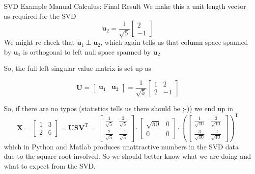 \documentclass[mathserif, aspectratio=1610]{intbeamer}
\begin{document}
\begin{frame}[t]{SVD Example Manual Calculus: Final Result}
We make this a unit length vector as required for the SVD
$$
\bm{u}_2 = \frac{1}{\sqrt{5}}\begin{bmatrix}2\\-1\end{bmatrix}
$$
We might re-check that $\bm{u}_1 \perp \bm{u}_2$, which again tells us
that column space spanned by $\bm{u}_1$ is orthogonal to left null space spanned by $\bm{u}_2$

So, the full left singular value matrix is set up as


$$
\bm{U} =
\begin{bmatrix}
\bm{u}_1 & \bm{u}_2
\end{bmatrix}=
\frac{1}{\sqrt{5}}
\begin{bmatrix}
1 & 2\\
2 & -1
\end{bmatrix}
$$

So, if there are no typos (statistics tells us there should be ;-))
we end up in
$$
\bm{X}
=
\begin{bmatrix}
1 & 3\\
2 & 6
\end{bmatrix}
= \bm{U} \bm{S} \bm{V}^\mathrm{T}=
\begin{bmatrix}
\frac{1}{\sqrt{5}} & \frac{2}{\sqrt{5}}\\
\frac{2}{\sqrt{5}} & \frac{-1}{\sqrt{5}}
\end{bmatrix}
\cdot
\begin{bmatrix}
\sqrt{50} & 0\\
0 & 0
\end{bmatrix}
\cdot
\left(
\begin{bmatrix}
\frac{1}{\sqrt{10}} & \frac{3}{\sqrt{10}} \\
\frac{3}{\sqrt{10}} & \frac{-1}{\sqrt{10}}
\end{bmatrix}
\right)^\mathrm{T}
$$
which in Python and Matlab produces unattractive numbers in the SVD data due to the square root involved.
So we should better know what we are doing and what to expect from the SVD.
\end{frame}
\end{document}
